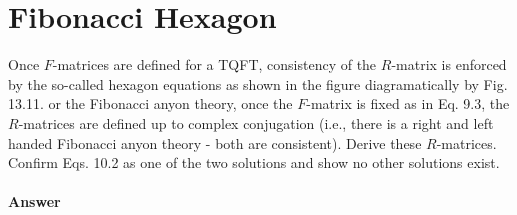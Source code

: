 
\section{Fibonacci Hexagon}
Once $F$-matrices are defined for a TQFT, consistency of the $R$-matrix is enforced by the so-called hexagon equations as shown in the figure diagramatically by Fig. 13.11. or the Fibonacci anyon theory, once the $F$-matrix is fixed as in Eq. 9.3, the $R$-matrices are defined up to complex conjugation (i.e., there is a right and left handed Fibonacci anyon theory - both are consistent). Derive these $R$-matrices. Confirm Eqs. 10.2 as one of the two solutions and show no other solutions exist.

\paragraph{Answer}


